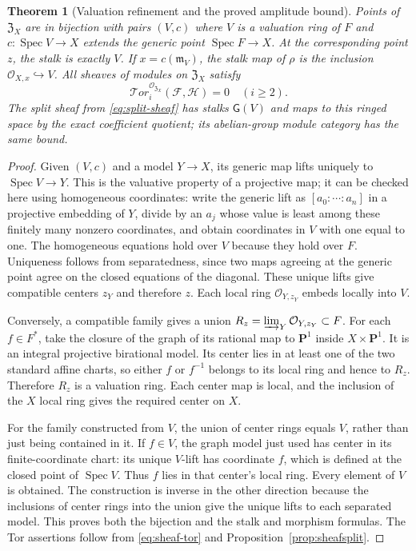 \documentclass[11pt,a4paper]{article}
\newtheorem{theorem}{Theorem}[section]
\theoremstyle{definition}\newtheorem{definition}[theorem]{Definition}
\newcommand{\Spec}{\operatorname{Spec}}\newcommand{\SpecMon}{\operatorname{Spec}_{\mathrm{mon}}}
\newcommand{\G}{\mathsf G}\newcommand{\Tor}{\operatorname{Tor}}\newcommand{\Frac}{\operatorname{Frac}}
\begin{document}
\begin{theorem}[Valuation refinement and the proved amplitude bound]
\label{thm:valuationrefinement}
Points of $\mathfrak Z_X$ are in bijection with pairs $(V,c)$ where $V$
is a valuation ring of $F$ and $c:\Spec V\to X$ extends the generic
point $\Spec F\to X$. At the corresponding point $z$, the stalk is
exactly $V$. If $x=c(\mathfrak m_V)$, the stalk map of $\rho$ is the
inclusion $\mathcal O_{X,x}\hookrightarrow V$. All sheaves of modules
on $\mathfrak Z_X$ satisfy
\[
 \mathcal{T}or_i^{\mathcal O_{\mathfrak Z_X}}(\mathcal F,\mathcal H)=0
 \quad(i\ge2).
 \tag{AV7.3}\label{eq:refinement-tor}
\]
The split sheaf from \eqref{eq:split-sheaf} has stalks $\G(V)$ and
maps to this ringed space by the exact coefficient quotient; its
abelian-group module category has the same bound.
\end{theorem}
\begin{proof}
Given $(V,c)$ and a model $Y\to X$, its generic map lifts uniquely to
$\Spec V\to Y$. This is the valuative property of a projective map;
it can be checked here using homogeneous coordinates: write the
generic lift as $[a_0:\cdots:a_n]$ in a projective embedding of $Y$,
divide by an $a_j$ whose value is least among these finitely many
nonzero coordinates, and obtain coordinates in $V$ with one equal to
one. The homogeneous equations hold over $V$ because they hold over
$F$. Uniqueness follows from separatedness, since two maps agreeing
at the generic point agree on the closed equations of the diagonal.
These unique lifts give compatible centers $z_Y$ and therefore $z$.
Each local ring $\mathcal O_{Y,z_Y}$ embeds locally into $V$.

Conversely, a compatible family gives a union
$R_z=\varinjlim_Y\mathcal O_{Y,z_Y}\subset F$. For each $f\in F^*$,
take the closure of the graph of its rational map to $\mathbf P^1$
inside $X\times\mathbf P^1$. It is an integral projective birational
model. Its center lies in at least one of the two standard affine
charts, so either $f$ or $f^{-1}$ belongs to its local ring and hence
to $R_z$. Therefore $R_z$ is a valuation ring. Each center map is local,
and the inclusion of the $X$ local ring gives the required center on $X$.

For the family constructed from $V$, the union of center rings equals
$V$, rather than just being contained in it. If $f\in V$, the graph
model just used has center in its finite-coordinate chart: its unique
$V$-lift has coordinate $f$, which is defined at the closed point of
$\Spec V$. Thus $f$ lies in that center's local ring. Every element
of $V$ is obtained. The construction is inverse in the other direction
because the inclusions of center rings into the union give the unique
lifts to each separated model. This proves both the bijection and the
stalk and morphism formulas. The Tor assertions follow from
\eqref{eq:sheaf-tor} and Proposition~\ref{prop:sheafsplit}.
\end{proof}
\end{document}
